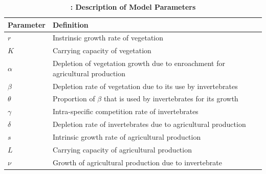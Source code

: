 \documentclass[12pt]{article}
\numberwithin{equation}{section}
\begin{document}
\begin{table}[htp!] \label{Table 1}
	\renewcommand{\arraystretch}{2}
	\caption{\textbf{: Description of Model Parameters}}
	\begin{center}
		\begin{tabular}{|p{2cm}||p{9cm}||p{5cm}|}
        \hline
			\textbf{Parameter} & \textbf{Definition} \\
			\hline
			$r$ & Instrinsic growth rate of vegetation\\
			\hline
			$K$ & Carrying capacity of vegetation\\
			\hline
			${\alpha}$ & Depletion of vegetation growth due to enroachment for agricultural production\\
			\hline
			${\beta}$ & Depletion rate of vegetation due to its use by invertebrates\\
			\hline
			${\theta}$ & Proportion of $\beta$ that is used by invertebrates for its growth\\
		    \hline
			${\gamma}$ & Intra-specific competition rate of invertebrates\\
		    \hline
			${\delta}$ & Depletion rate of invertebrates due to agricultural production\\
		    \hline
			${s}$ & Intrinsic growth rate of agricultural production\\
			\hline
			${L}$ & Carrying capacity of agricultural production\\
			\hline
			${\nu}$ & Growth of agricultural production due to invertebrate\\
			\hline			
		\end{tabular}\label{Table 1}
	\end{center}
\end{table}
\end{document}
